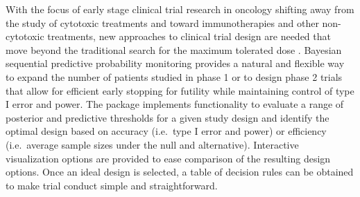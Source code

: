 With the focus of early stage clinical trial research in oncology
shifting away from the study of cytotoxic treatments and toward
immunotherapies and other non-cytotoxic treatments, new approaches to
clinical trial design are needed that move beyond the traditional search
for the maximum tolerated dose \citep{Hobbs2019}. Bayesian sequential
predictive probability monitoring provides a natural and flexible way to
expand the number of patients studied in phase 1 or to design phase 2
trials that allow for efficient early stopping for futility while
maintaining control of type I error and power. The  package
implements functionality to evaluate a range of posterior and predictive
thresholds for a given study design and identify the optimal design
based on accuracy (i.e.~type I error and power) or efficiency
(i.e.~average sample sizes under the null and alternative). Interactive
visualization options are provided to ease comparison of the resulting
design options. Once an ideal design is selected, a table of decision
rules can be obtained to make trial conduct simple and straightforward.

\begin{verbatim}
\end{verbatim}



\address{%
Emily C. Zabor\\
Department of Quantitative Health Sciences \& Taussig Cancer Institute,
Cleveland Clinic\\%
9500 Euclid Ave. CA-60\\ Cleveland, OH 44195 USA\\
%
\url{http://www.emilyzabor.com/}\\%
\textit{ORCiD: \href{https://orcid.org/0000-0002-1402-4498}{0000-0002-1402-4498}}\\%
\href{mailto:zabore2@ccf.org}{\nolinkurl{zabore2@ccf.org}}%
}

\address{%
Brian P. Hobbs\\
Dell Medical School, The University of Texas at Austin\\%
true\\ Austin, TX 78712\\
%
%
\textit{ORCiD: \href{https://orcid.org/0000-0003-2189-5846}{0000-0003-2189-5846}}\\%
\href{mailto:brian.hobbs@austin.utexas.edu}{\nolinkurl{brian.hobbs@austin.utexas.edu}}%
}

\address{%
Michael J. Kane\\
Department of Biostatistics, Yale University\\%
60 College Street\\ New Haven, CT 06511\\
%
%
\textit{ORCiD: \href{https://orcid.org/0000-0003-1899-6662}{0000-0003-1899-6662}}\\%
\href{mailto:michael.kane@yale.edu}{\nolinkurl{michael.kane@yale.edu}}%
}
